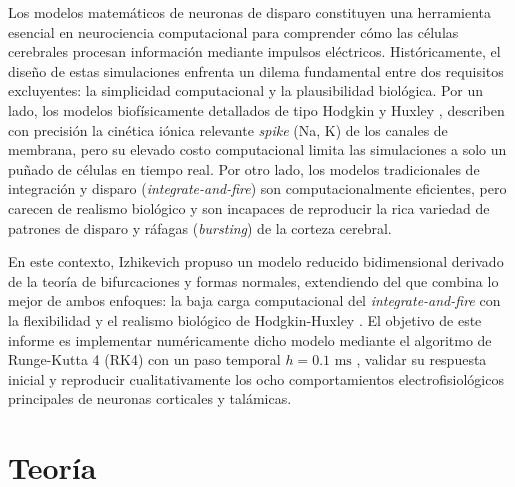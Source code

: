 \documentclass[aps,prl,twocolumn,superscriptaddress]{revtex4-2}
\begin{document}
Los modelos matemáticos de neuronas de disparo constituyen una herramienta esencial en neurociencia computacional para comprender cómo las células cerebrales procesan información mediante impulsos eléctricos. Históricamente, el diseño de estas simulaciones enfrenta un dilema fundamental entre dos requisitos excluyentes: la simplicidad computacional y la plausibilidad biológica. Por un lado, los modelos biofísicamente detallados de tipo Hodgkin y Huxley \cite{hodgkin1952quantitative}, describen con precisión la cinética iónica relevante \textit{spike} (Na, K) de los canales de membrana, pero su elevado costo computacional limita las simulaciones a solo un puñado de células en tiempo real. Por otro lado, los modelos tradicionales de integración y disparo (\textit{integrate-and-fire}) son computacionalmente eficientes, pero carecen de realismo biológico y son incapaces de reproducir la rica variedad de patrones de disparo y ráfagas (\textit{bursting}) de la corteza cerebral.

En este contexto, Izhikevich propuso un modelo reducido bidimensional derivado de la teoría de bifurcaciones y formas normales, extendiendo del que combina lo mejor de ambos enfoques: la baja carga computacional del \textit{integrate-and-fire} con la flexibilidad y el realismo biológico de Hodgkin-Huxley \cite{izhikevich2003simple}. El objetivo de este informe es implementar numéricamente dicho modelo mediante el algoritmo de Runge-Kutta 4 (RK4) con un paso temporal  $h = 0.1\text{ ms}$ , validar su respuesta inicial y reproducir cualitativamente los ocho comportamientos electrofisiológicos principales de neuronas corticales y talámicas.

\section{Teoría}
\end{document}
